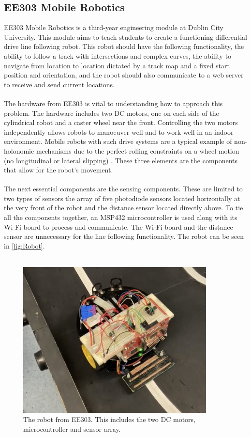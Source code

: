 \documentclass[a4paper,12pt]{article}
\begin{document}
\subsection{EE303 Mobile Robotics}

EE303 Mobile Robotics is a third-year engineering module at Dublin City University. This module aims to teach students to create a functioning differential drive line following robot. This robot should have the following functionality, the ability to follow a track with intersections and complex curves, the ability to navigate from location to location dictated by a track map and a fixed start position and orientation, and the robot should also communicate to a web server to receive and send current locations.
\\\\
The hardware from EE303 is vital to understanding how to approach this problem. The hardware includes two DC motors, one on each side of the cylindrical robot and a caster wheel near the front. Controlling the two motors independently allows robots to manoeuver well and to work well in an indoor environment. Mobile robots with such drive systems are a typical example of non-holonomic mechanisms due to the perfect rolling constraints on a wheel motion (no longitudinal or lateral slipping) \cite{Malu}. These three elements are the components that allow for the robot's movement. 
\\\\
The next essential components are the sensing components. These are limited to two types of sensors the array of five photodiode sensors located horizontally at the very front of the robot and the distance sensor located directly above. To tie all the components together, an MSP432 microcontroller is used along with its Wi-Fi board to process and communicate. The Wi-Fi board and the distance sensor are unnecessary for the line following functionality. The robot can be seen in \autoref{fig:Robot}.
\\\\
\begin{figure}[H]
\centering
\includegraphics[width=10cm]{imgs/Robot.jpg}
\caption{The robot from EE303. This includes the two DC motors, microcontroller and sensor array.}
\label{fig:Robot}
\end{figure}
\end{document}
